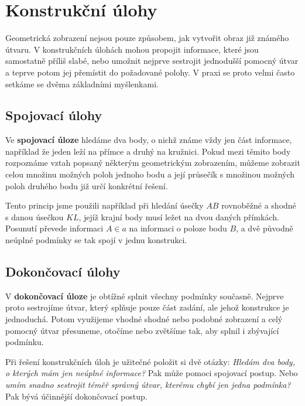 \documentclass[12pt,a4paper]{article}
\begin{document}

\section{Konstrukční úlohy}

Geometrická zobrazení nejsou pouze způsobem, jak vytvořit obraz již známého útvaru. V konstrukčních úlohách mohou propojit informace, které jsou samostatně příliš slabé, nebo umožnit nejprve sestrojit jednodušší pomocný útvar a teprve potom jej přemístit do požadované polohy. V praxi se proto velmi často setkáme se dvěma základními myšlenkami.

\subsection{Spojovací úlohy}

Ve \textbf{spojovací úloze} hledáme dva body, o nichž známe vždy jen část informace, například že jeden leží na přímce a druhý na kružnici. Pokud mezi těmito body rozpoznáme vztah popsaný některým geometrickým zobrazením, můžeme zobrazit celou množinu možných poloh jednoho bodu a její průsečík s množinou možných poloh druhého bodu již určí konkrétní řešení.

Tento princip jsme použili například při hledání úsečky $AB$ rovnoběžné a shodné s danou úsečkou $KL$, jejíž krajní body musí ležet na dvou daných přímkách. Posunutí převede informaci $A\in a$ na informaci o poloze bodu $B$, a dvě původně neúplné podmínky se tak spojí v jednu konstrukci.

\subsection{Dokončovací úlohy}

V \textbf{dokončovací úloze} je obtížné splnit všechny podmínky současně. Nejprve proto sestrojíme útvar, který splňuje pouze část zadání, ale jehož konstrukce je jednoduchá. Potom využijeme vhodné shodné nebo podobné zobrazení a celý pomocný útvar přesuneme, otočíme nebo zvětšíme tak, aby splnil i zbývající podmínku.

\begin{notebox}
    Při řešení konstrukčních úloh je užitečné položit si dvě otázky: \emph{Hledám dva body, o kterých mám jen neúplné informace?} Pak může pomoci spojovací postup. Nebo \emph{umím snadno sestrojit téměř správný útvar, kterému chybí jen jedna podmínka?} Pak bývá účinnější dokončovací postup.
\end{notebox}
\end{document}
